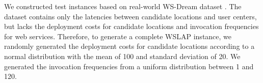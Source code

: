 \documentclass[10pt,journal,compsoc]{IEEEtran}
\begin{document}
We constructed test instances based on real-world WS-Dream dataset \cite{Service_dataset}. The dataset
contains only the latencies between candidate locations and user centers, but lacks the deployment costs for candidate locations and invocation frequencies for web services. Therefore, to generate a complete WSLAP instance, we randomly generated the deployment costs for candidate locations according to a normal distribution with the mean of 100 and standard deviation of 20. We generated the invocation frequencies from a uniform distribution between 1 and 120. 


\end{document}
